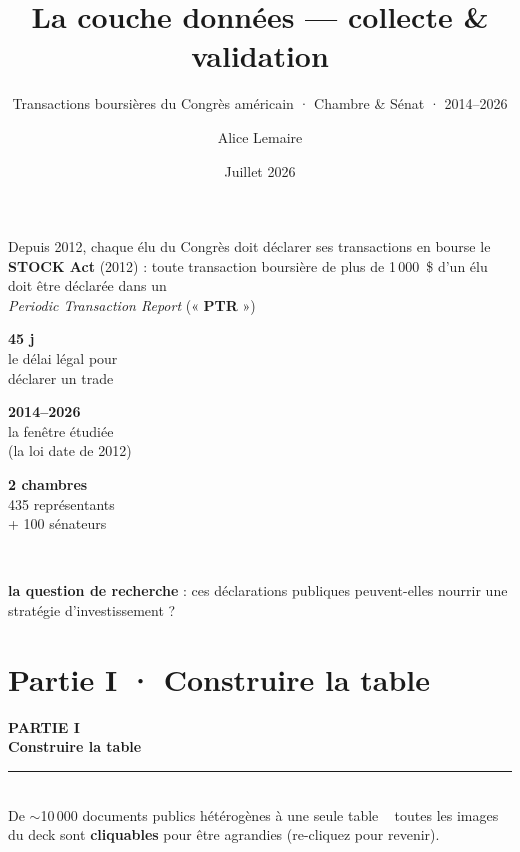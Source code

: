 \documentclass[11pt,aspectratio=169]{beamer}
\title[La couche données]{La couche données --- collecte \& validation}
\subtitle{Transactions boursières du Congrès américain · Chambre \& Sénat · 2014--2026}
\author[A.~Lemaire]{Alice Lemaire}
\institute[Ramify]{Document de recherche --- livrable Ramify}
\date{Juillet 2026}
\newcommand{\tuile}[3]{%
  \begin{minipage}[t]{0.23\textwidth}\centering
    \colorbox{#1}{\parbox[c][21mm][c]{\dimexpr\linewidth-8pt}{\centering
      {\color{white}\Large\textbf{#2}}\\[0.6mm]
      {\color{white}\footnotesize #3}}}
  \end{minipage}}
\begin{document}
\begin{frame}[plain]
  \titlepage
\end{frame}


\begin{frame}{Depuis 2012, chaque élu du Congrès doit déclarer ses transactions en bourse}
  \centering
  {\normalsize le \textbf{STOCK Act} (2012) : toute transaction boursière de plus de
   1\,000~\$ d'un élu doit être déclarée dans un\\
   \emph{Periodic Transaction Report} (« \textbf{PTR} »)}\\[5mm]
  \tuile{helec}{45 j}{le délai légal pour\\déclarer un trade}\hfill
  \tuile{grisC}{2014--2026}{la fenêtre étudiée\\(la loi date de 2012)}\hfill
  \tuile{dataC}{2 chambres}{435 représentants\\+ 100 sénateurs}\\[5mm]
  \colorbox{helec!10}{\parbox{0.86\textwidth}{\centering\footnotesize\vspace{0.8mm}
    \textbf{la question de recherche} : ces déclarations publiques peuvent-elles nourrir
    une stratégie d'investissement ?\vspace{0.8mm}}}
\end{frame}


\section{Partie I · Construire la table}

\begin{frame}[plain]
  \centering
  \vspace{12mm}
  {\color{helec!85}\large\textbf{PARTIE I}}\\[3mm]
  {\color{black!88}\fontsize{30}{34}\selectfont\textbf{Construire la table}}\\[3mm]
  {\color{helec!45}\rule{0.30\textwidth}{1.2pt}}\\[3mm]
  {\color{black!55}\large De $\sim$10\,000 documents publics hétérogènes à une seule table}
  \vspace{4mm}
  {\footnotesize\color{black!50}{\color{selec}$\oplus$}~ toutes les images du deck sont
   \textbf{cliquables} pour être agrandies (re-cliquez pour revenir).}
  \vspace{8mm}
\end{frame}
\end{document}
